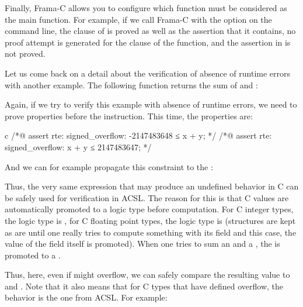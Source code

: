

Finally, Frama-C allows you to configure which function
must be considered as the main function. For example, if we call Frama-C with
the option  on the command line, the 
clause of  is proved as well as the assertion that it contains,
no proof attempt is generated for the  clause of the
 function, and the assertion in  is not
proved.






Let us come back on a detail about the verification of absence of runtime
errors with another example. The following function returns the sum of
 and :




Again, if we try to verify this example with absence of runtime errors, we need
to prove properties before the instruction. This time, the properties are:


\begin{CodeBlock}{c}
/*@ assert rte: signed_overflow: -2147483648 ≤ x + y; */
/*@ assert rte: signed_overflow: x + y ≤ 2147483647; */
\end{CodeBlock}


And we can for example propagate this constraint to the :




Thus, the very same expression that may produce an undefined behavior in C can
be safely used for verification in ACSL. The reason for this is that C values
are automatically promoted to a logic type before computation. For C integer
types, the logic type is , for C floating point types, the
logic type is  (structures are kept as are until one really
tries to compute something with its field and this case, the value of the field
itself is promoted). When one tries to sum an  and a
, the  is promoted to a .


Thus, here, even if  might overflow, we can safely compare the
resulting value to  and . Note that
it also means that for C types that have defined overflow, the behavior is the
one from ACSL. For example:


